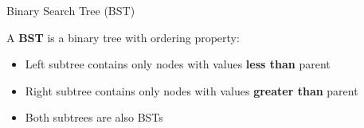 \documentclass[aspectratio=169,xcolor=dvipsnames]{beamer}
\begin{document}
\begin{frame}{Binary Search Tree (BST)}
  \begin{definition}
    A \textbf{BST} is a binary tree with ordering property:
    \begin{itemize}
      \item Left subtree contains only nodes with values \textbf{less than} parent
      \item Right subtree contains only nodes with values \textbf{greater than} parent
      \item Both subtrees are also BSTs
    \end{itemize}
  \end{definition}

  \vspace{0.3cm}

  \begin{center}
  \end{center}
\end{frame}
\end{document}
